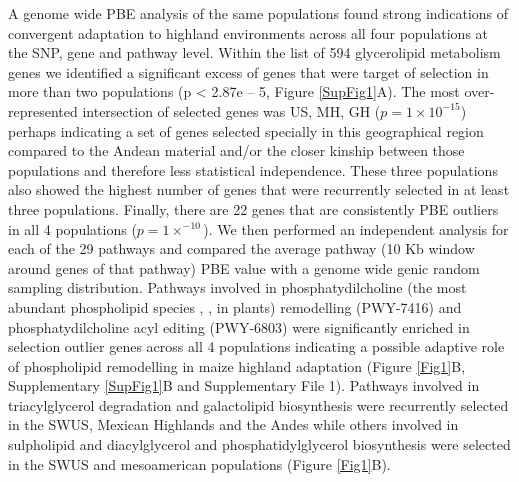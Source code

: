 \documentclass[9pt,twocolumn,twoside,lineno]{gsajnl}
\begin{document}
A genome wide PBE analysis of the same populations \cite{Wang2020-mp} found strong indications of convergent adaptation to highland environments across all four populations at the SNP, gene and pathway level.
Within the list of 594 glycerolipid metabolism genes we identified a significant excess of genes that were target of selection in more than two populations (p < 2.87e – 5, Figure \ref{SupFig1}A).  
The most over-represented intersection of selected genes was US, MH, GH ($p = 1  \times 10 ^{-15} $) perhaps indicating a set of genes selected specially in this geographical region compared to the Andean material and/or the closer kinship between those populations and therefore less statistical independence. 
These three populations also showed the highest number of genes that were recurrently selected in at least three populations. 
Finally, there are 22 genes that are consistently PBE outliers in all 4 populations ($p = 1  \times  ^{-10}$). 
We then performed an independent analysis for each of the 29 pathways and compared the average pathway (10 Kb window around genes of that pathway) PBE value with a genome wide genic random sampling distribution.
Pathways involved in phosphatydilcholine (the most abundant phospholipid species \citep{Gu2017-nd}, \citep{Poincelot1976-qe}, \citep{Hawke1974-ab} in plants) remodelling (PWY-7416) and phosphatydilcholine acyl editing (PWY-6803) were significantly enriched in selection outlier genes across all 4 populations indicating a possible adaptive role of phospholipid remodelling in maize highland adaptation (Figure \ref{Fig1}B, Supplementary \ref{SupFig1}B and Supplementary File 1). 
Pathways involved in triacylglycerol degradation and galactolipid biosynthesis were recurrently selected in the SWUS, Mexican Highlands and the Andes while others involved in sulpholipid and diacylglycerol and phosphatidylglycerol biosynthesis were selected in the SWUS and mesoamerican populations (Figure \ref{Fig1}B).  
\end{document}
